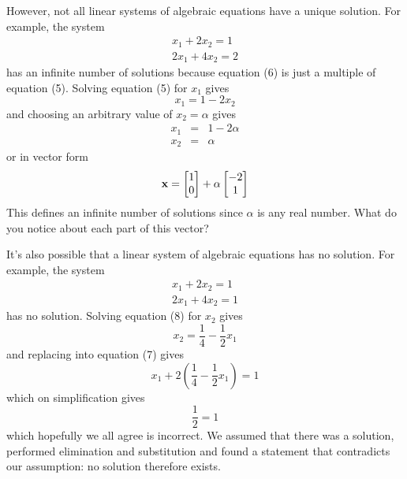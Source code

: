 However, not all linear systems of algebraic equations have a unique solution. For example, the system
\begin{eqnarray}
x_1 + 2 x_2 = 1 \\
2x_1 + 4 x_2 = 2
\end{eqnarray}
has an infinite number of solutions because equation (6) is just a multiple of equation (5). Solving equation (5) for $x_1$ gives
\[ x_1 = 1 - 2 x_2 \]
and choosing an arbitrary value of $x_2 = \alpha$ gives
\begin{eqnarray*}
x_1 &=& 1 - 2 \alpha \\
x_2 &=& \alpha
\end{eqnarray*}
or in vector form
\[ \mathbf{x} = \begin{bmatrix} 1 \\ 0 \end{bmatrix} + \alpha \begin{bmatrix} -2 \\ 1 \end{bmatrix} \]
This defines an infinite number of solutions since $\alpha$ is any real number. What do you notice about each part of this vector?

It's also possible that a linear system of algebraic equations has no solution. For example, the system
\begin{eqnarray}
x_1 + 2 x_2 = 1 \\
2x_1 + 4 x_2 = 1
\end{eqnarray}
has no solution. Solving equation (8) for $x_2$ gives
\[ x_2 = \frac{1}{4} - \frac{1}{2} x_1 \]
and replacing into equation (7) gives
\[x_1 + 2 (\frac{1}{4} - \frac{1}{2} x_1) = 1 \]
which on simplification gives
\[ \frac{1}{2} = 1 \]
which hopefully we all agree is incorrect. We assumed that there was a solution, performed elimination and substitution and found a statement that contradicts our assumption: no solution therefore exists.

